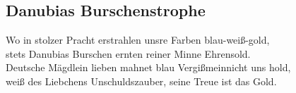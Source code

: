 
\subsection*{Danubias Burschenstrophe}
%

\thestrophe Wo in stolzer Pracht erstrahlen unsre Farben blau-weiß-gold, \\
stets Danubias Burschen ernten reiner Minne Ehrensold. \\
Deutsche Mägdlein lieben mahnet blau Vergißmeinnicht uns hold, \\ 
weiß des Liebchens Unschuldszauber, seine Treue ist das Gold.